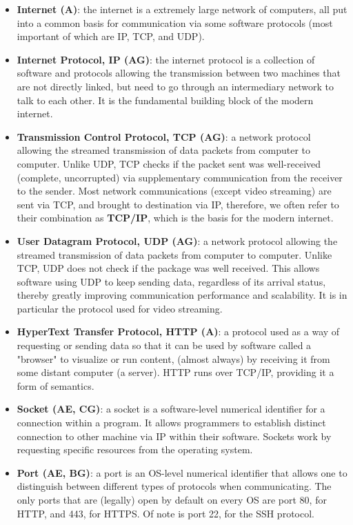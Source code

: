 \documentclass{article}
\begin{document}
\begin{itemize}
	\item \textbf{Internet (A)}: the internet is a extremely large network of computers, all put into a common basis for communication via some software protocols (most important of which are IP, TCP, and UDP).

	\item \textbf{Internet Protocol, IP (AG)}: the internet protocol is a collection of software and protocols allowing the transmission between two machines that are not directly linked, but need to go through an intermediary network to talk to each other. It is the fundamental building block of the modern internet.

	\item \textbf{Transmission Control Protocol, TCP (AG)}: a network protocol allowing the streamed transmission of data packets from computer to computer. Unlike UDP, TCP checks if the packet sent was well-received (complete, uncorrupted) via supplementary communication from the receiver to the sender. Most network communications (except video streaming) are sent via TCP, and brought to destination via IP, therefore, we often refer to their combination as \textbf{TCP/IP}, which is the basis for the modern internet.

	\item \textbf{User Datagram Protocol, UDP (AG)}: a network protocol allowing the streamed transmission of data packets from computer to computer. Unlike TCP, UDP does not check if the package was well received. This allows software using UDP to keep sending data, regardless of its arrival status, thereby greatly improving communication performance and scalability. It is in particular the protocol used for video streaming.

	\item \textbf{HyperText Transfer Protocol, HTTP (A)}: a protocol used as a way of requesting or sending data so that it can be used by software called a "browser" to visualize or run content, (almost always) by receiving it from some distant computer (a server). HTTP runs over TCP/IP, providing it a form of semantics.

	\item \textbf{Socket (AE, CG)}: a socket is a software-level numerical identifier for a connection within a program. It allows programmers to establish distinct connection to other machine via IP within their software. Sockets work by requesting specific resources from the operating system.

	\item \textbf{Port (AE, BG)}: a port is an OS-level numerical identifier that allows one to distinguish between different types of protocols when communicating. The only ports that are (legally) open by default on every OS are port 80, for HTTP, and 443, for HTTPS. Of note is port 22, for the SSH protocol.


\end{itemize}
\end{document}
